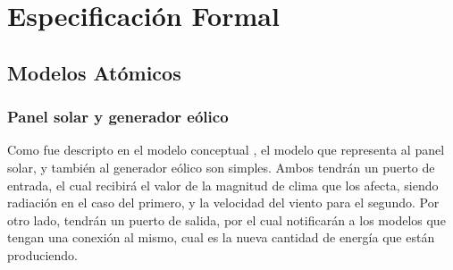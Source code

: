 
\newcommand{\Reals}{{\rm I\!R}}

\newcommand{\deltaInt}[1]{
    \begin{algorithm}[H]
        \caption{$\delta_{int} (s)$}
        \begin{algorithmic}
        #1
        \end{algorithmic}
    \end{algorithm}
}
\newcommand{\deltaExt}[1]{
    \begin{algorithm}[H]
        \caption{$\delta_{ext} (s,e,x)$}
        \begin{algorithmic}
        #1
        \end{algorithmic}
    \end{algorithm}
}
\newcommand{\lambdaOut}[1]{
    \begin{algorithm}[H]
        \caption{$\lambda (s)$}
        \begin{algorithmic}
        #1
        \end{algorithmic}
    \end{algorithm}
}

\section{Especificación Formal}

\subsection{Modelos Atómicos}

\subsubsection{Panel solar y generador eólico}
Como fue descripto en el modelo conceptual ,
el modelo que representa al panel solar, y también al generador eólico son
simples. Ambos tendrán un puerto de entrada, el cual recibirá el valor de la
magnitud de clima que los afecta, siendo radiación en el caso del primero, y
la velocidad del viento para el segundo. Por otro lado, tendrán un puerto de
salida, por el cual notificarán a los modelos que tengan una conexión al
mismo, cual es la nueva cantidad de energía que están produciendo.


